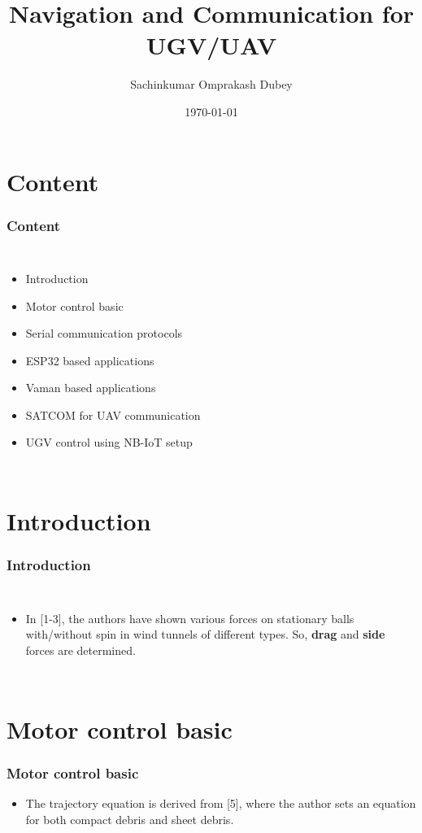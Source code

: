 \documentclass{beamer}
\title{Navigation and Communication for UGV/UAV}
\author{Sachinkumar Omprakash Dubey}
\institute{Indian Institute of Technology, Hyderabad.}
\date{\today}
\begin{document}
\begin{frame}
\titlepage
\end{frame}
\section{Content}
\begin{frame}
\frametitle{Content}
\begin{columns}
  \begin{itemize}
  \item Introduction
  \item Motor control basic
  \item Serial communication protocols
  \item ESP32 based applications
  \item Vaman based applications
  \item SATCOM for UAV communication
  \item UGV control using NB-IoT setup
  \end{itemize}
\end{columns}

\end{frame}


\section{Introduction}
\begin{frame}
\frametitle{Introduction}
\begin{columns}
  \begin{itemize}
  \item In [1-3], the authors have shown various forces on stationary balls with/without spin in wind tunnels of different types. So, \textbf{drag} and \textbf{side} forces are determined.

  \end{itemize}
\end{columns}

\end{frame}


\section{Motor control basic}
\begin{frame}
\frametitle{Motor control basic}


  \begin{itemize}
  \item The trajectory equation is derived from [5], where the author sets an equation for both compact debris and sheet debris.
  
  \end{itemize}



\end{frame}
\end{document}
